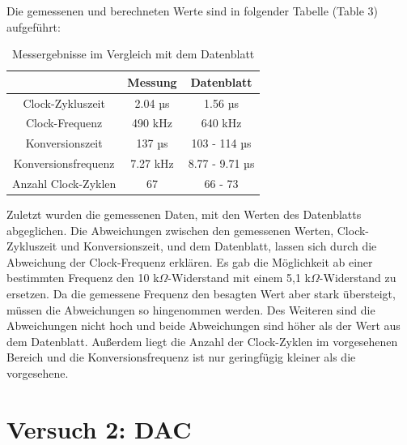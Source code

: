 \documentclass[a4paper,12pt]{article}
\begin{document}
Die gemessenen und berechneten Werte sind in folgender Tabelle (Table 3) aufgeführt:
\setlength{\tabcolsep}{12pt}
\begin{table}[H]
    \centering
    \begin{tabular}{|c|c|c|}
	\hline
        	 & Messung & Datenblatt\\
	\hline
	Clock-Zykluszeit & 2.04 µs & 1.56 µs\\
	Clock-Frequenz & 490 kHz & 640 kHz\\
	Konversionszeit & 137 µs & 103 - 114 µs\\
	Konversionsfrequenz & 7.27 kHz & 8.77 - 9.71 µs\\
	Anzahl Clock-Zyklen & 67 & 66 - 73\\
	\hline
    \end{tabular}
    \caption{Messergebnisse im Vergleich mit dem Datenblatt}
\end{table}
\noindent Zuletzt wurden die gemessenen Daten, mit den Werten des Datenblatts abgeglichen. Die Abweichungen zwischen den gemessenen Werten, Clock-Zykluszeit und Konversionszeit, und dem Datenblatt, lassen sich durch die Abweichung der Clock-Frequenz erklären. Es gab die Möglichkeit ab einer bestimmten Frequenz den 10 k$\Omega$-Widerstand mit einem 5,1 k$\Omega$-Widerstand zu ersetzen. Da die gemessene Frequenz den besagten Wert aber stark übersteigt, müssen die Abweichungen so hingenommen werden. Des Weiteren sind die Abweichungen nicht hoch und beide Abweichungen sind höher als der Wert aus dem Datenblatt. Außerdem liegt die Anzahl der Clock-Zyklen im vorgesehenen Bereich und die Konversionsfrequenz ist nur geringfügig kleiner als die vorgesehene.
\newpage




\section{Versuch 2: DAC}
\end{document}
